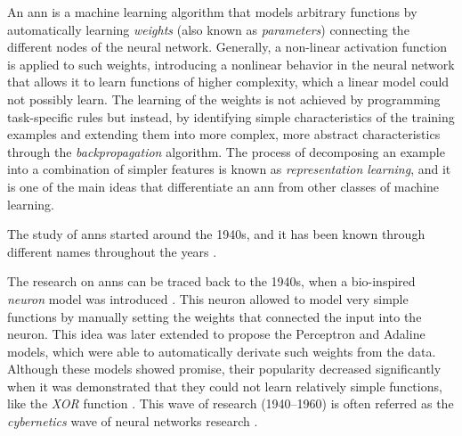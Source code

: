 

An \gls{ann} is a machine learning algorithm that models
arbitrary functions by automatically learning \emph{weights}
(also known as \emph{parameters}) connecting the different
nodes of the neural network. Generally, a non-linear
activation function is applied to such weights, introducing
a nonlinear behavior in the neural network that allows it to
learn functions of higher complexity, which a linear model
could not possibly learn. The learning of the weights is not
achieved by programming task-specific rules but instead, by
identifying simple characteristics of the training examples
and extending them into more complex, more abstract
characteristics through the \emph{backpropagation}
algorithm. The process of decomposing an example into a
combination of simpler features is known as
\emph{representation learning}, and it is one of the main
ideas that differentiate an \gls{ann} from other classes of
machine learning.

The study of \glspl{ann} started around the 1940s, and it
has been known through different names throughout the years
\parencite{goodfellow2016deep}.

The research on \glspl{ann} can be traced back to the 1940s,
when a bio-inspired \emph{neuron} model was introduced
\parencite{mcculloch1943logical}. This neuron allowed to
model very simple functions by manually setting the weights
that connected the input into the neuron. This idea was
later extended to propose the Perceptron
\parencite{rosenblatt1958perceptron} and Adaline
\parencite{widrow1960adaptive} models, which were able to
automatically derivate such weights from the data. Although
these models showed promise, their popularity decreased
significantly when it was demonstrated that they could not
learn relatively simple functions, like the \emph{XOR}
function \parencite{minsky1972perceptrons}. This wave of
research (1940--1960) is often referred as the
\emph{cybernetics} wave of neural networks research
\parencite{goodfellow2016deep}.

